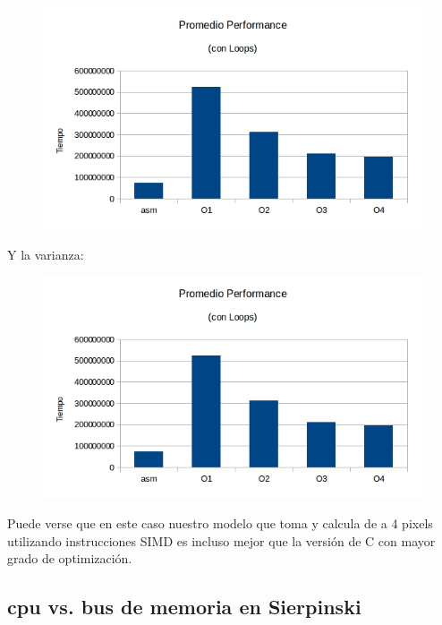 \documentclass[a4paper]{article}
\begin{document}
\begin{figure}[h!]
  \begin{center}
  \includegraphics[scale=0.66]{Graficos1.4/sie/PSO.png}
  \label{nombreparareferenciar7}
  \end{center}
\end{figure}

\newpage

Y la varianza:

\begin{figure}[h!]
  \begin{center}
  \includegraphics[scale=0.66]{Graficos1.4/sie/PSO.png}
  \label{nombreparareferenciar8}
  \end{center}
\end{figure}

Puede verse que en este caso nuestro modelo que toma y calcula de a 4 pixels utilizando instrucciones SIMD es incluso mejor que la versión de C con mayor grado de optimización.

\newpage
\subsection{cpu vs. bus de memoria en Sierpinski}
\end{document}
